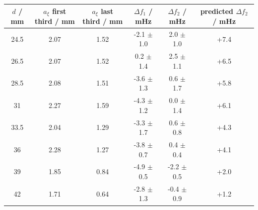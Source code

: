 \begin{tabular}{@{}cccccc@{}}
\toprule
$d$ / mm & $a_\xi$ first third / mm & $a_\xi$ last third / mm & $\Delta f_1$ / mHz & $\Delta f_2$ / mHz & predicted $\Delta f_2$ / mHz \\
\midrule
24.5 & 2.07 & 1.52 & -2.1 $\pm$ 1.0 & 2.0 $\pm$ 1.0 & +7.4 \\
26.5 & 2.07 & 1.52 & 0.2 $\pm$ 1.4 & 2.5 $\pm$ 1.1 & +6.5 \\
28.5 & 2.08 & 1.51 & -3.6 $\pm$ 1.3 & 0.6 $\pm$ 1.7 & +5.8 \\
31 & 2.27 & 1.59 & -4.3 $\pm$ 1.2 & 0.0 $\pm$ 1.4 & +6.1 \\
33.5 & 2.04 & 1.29 & -3.3 $\pm$ 1.7 & 0.6 $\pm$ 0.8 & +4.3 \\
36 & 2.28 & 1.27 & -3.8 $\pm$ 0.7 & 0.4 $\pm$ 0.4 & +4.1 \\
39 & 1.85 & 0.84 & -4.9 $\pm$ 0.5 & -2.2 $\pm$ 0.5 & +2.0 \\
42 & 1.71 & 0.64 & -2.8 $\pm$ 1.3 & -0.4 $\pm$ 0.9 & +1.2 \\
\bottomrule
\end{tabular}